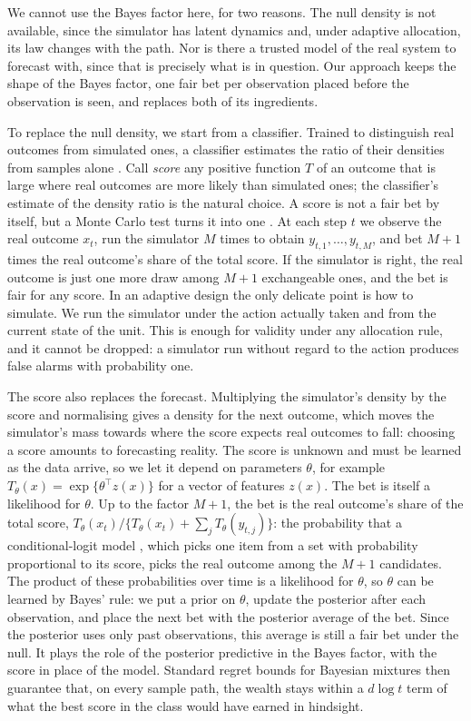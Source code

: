 \documentclass[12pt]{article}
\theoremstyle{remark}
\begin{document}
We cannot use the Bayes factor here, for two reasons. The null density is not
available, since the simulator has latent dynamics and, under adaptive
allocation, its law changes with the path. Nor is there a trusted model of the
real system to forecast with, since that is precisely what is in question.
Our approach keeps the shape of the Bayes factor, one fair bet per
observation placed before the observation is seen, and replaces both of its
ingredients.

To replace the null density, we start from a classifier. Trained to
distinguish real outcomes from simulated ones, a classifier estimates the
ratio of their densities from samples alone \citep{thomas2022lfire}. Call
\emph{score} any positive function $T$ of an outcome that is large where real
outcomes are more likely than simulated ones; the classifier's estimate of the
density ratio is the natural choice. A score is not a fair bet by itself, but
a Monte Carlo test turns it into one \citep{besag1989generalized}. At each
step $t$ we observe the real outcome $x_t$, run the simulator $M$ times to
obtain $y_{t,1},\dots,y_{t,M}$, and bet $M+1$ times the real outcome's share
of the total score. If the simulator is right, the real outcome is just one
more draw among $M+1$ exchangeable ones, and the bet is fair for any score. In
an adaptive design the only delicate point is how to simulate. We run the
simulator under the action actually taken and from the current state of the
unit. This is enough for validity under any allocation rule, and it cannot be
dropped: a simulator run without regard to the action produces false alarms
with probability one.

The score also replaces the forecast. Multiplying the simulator's density by
the score and normalising gives a density for the next outcome, which moves
the simulator's mass towards where the score expects real outcomes to fall:
choosing a score amounts to forecasting reality. The score is unknown and must
be learned as the data arrive, so we let it depend on parameters $\theta$, for
example $T_\theta(x) = \exp\{\theta^\top z(x)\}$ for a vector of features
$z(x)$. The bet is itself a likelihood for $\theta$. Up to the factor $M+1$,
the bet is the real outcome's share of the total score,
$T_\theta(x_t)/\{T_\theta(x_t) + \sum_{j} T_\theta(y_{t,j})\}$: the
probability that a conditional-logit model \citep{mcfadden1974conditional},
which picks one item from a set
with probability proportional to its score, picks the real outcome among the
$M+1$ candidates. The product of these probabilities over time is a likelihood
for $\theta$, so $\theta$ can be learned by Bayes' rule: we put a prior on
$\theta$, update the posterior after each observation, and place the next bet
with the posterior average of the bet. Since the posterior uses only past
observations, this average is still a fair bet under the null. It plays the
role of the posterior predictive in the Bayes factor, with the score in place
of the model. Standard regret bounds for Bayesian mixtures
\citep{kakade2005online} then guarantee that, on every sample path, the wealth
stays within a $d\log t$ term of what the best score in the class would have
earned in hindsight.
\end{document}
